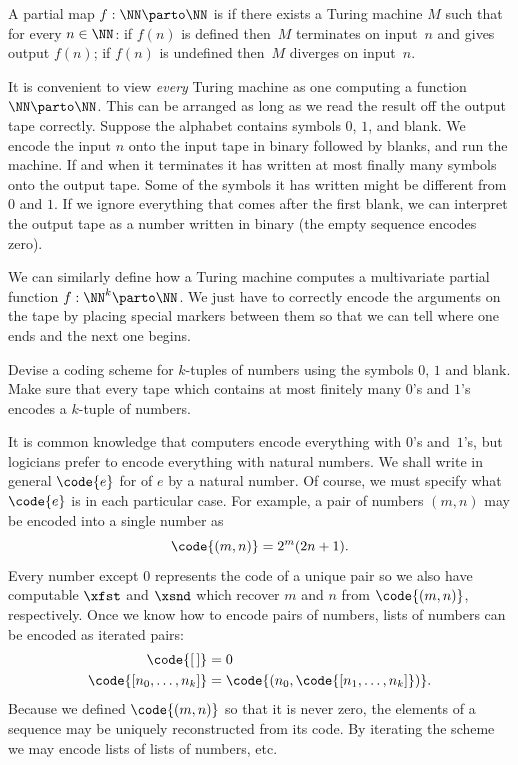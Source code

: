 \begin{definition}
  A partial map $f : \NN \parto \NN$ is  if there exists a Turing machine $M$ such that for every $n \in \NN$: if $f(n)$ is defined then~$M$ terminates on input~$n$ and gives output $f(n)$; if $f(n)$ is undefined then~$M$ diverges on input~$n$.
\end{definition}

It is convenient to view \emph{every} Turing machine as one computing a
function $\NN \parto \NN$. This can be arranged as long as we read the
result off the output tape correctly. Suppose the alphabet contains
symbols $0$, $1$, and blank. We encode the input $n$ onto the input
tape in binary followed by blanks, and run the machine. If and when it
terminates it has written at most finally many symbols onto the output
tape. Some of the symbols it has written might be different from $0$
and $1$. If we ignore everything that comes after the first blank, we
can interpret the output tape as a number written in binary (the empty
sequence encodes zero).

We can similarly define how a Turing machine computes a multivariate
partial function $f : \NN^k \parto \NN$. We just have to correctly
encode the arguments on the tape by placing special markers between
them so that we can tell where one ends and the next one begins.

\begin{exercise}
  Devise a coding scheme for $k$-tuples of numbers using the symbols $0$, $1$ and blank. Make sure that every tape which contains at most finitely many $0$'s and $1$'s encodes a $k$-tuple of numbers.
\end{exercise}

It is common knowledge that computers encode everything with $0$'s and~$1$'s, but logicians prefer to encode everything with natural numbers.
We shall write in general $\code{e}$ for  of $e$ by a natural
number. Of course, we must specify what $\code{e}$ is in each
particular case. For example, a pair of numbers $(m, n)$ may be
encoded into a single number as
%
\begin{equation*}
  \code{(m, n)} = 2^m (2 n + 1).
\end{equation*}
%
Every number except $0$ represents the code of a unique pair so we
also have computable  $\xfst$ and $\xsnd$ which
recover $m$ and $n$ from $\code{(m, n)}$, respectively.
Once we know how to encode pairs of numbers, lists of numbers can be encoded as iterated pairs:
%
\begin{align*}
  \code{[\,]} &= 0 \\
  \code{[n_0, \ldots, n_k]} &= \code{(n_0, \code{[n_1, \ldots, n_k]})}.
\end{align*}
%
Because we defined $\code{(m,n)}$ so that it is never zero, the
elements of a sequence may be uniquely reconstructed from its code.
By iterating the scheme we may encode lists of lists of numbers, etc.

